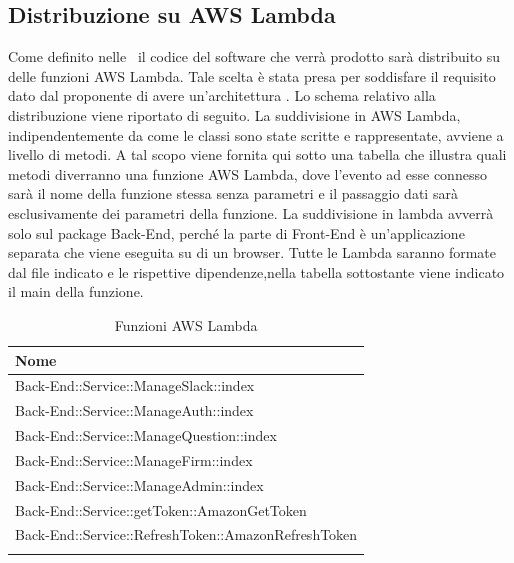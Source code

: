 \documentclass[../DefinizioneDiProdotto_v3.0.0.tex]{subfiles}
\begin{document}
\subsection{Distribuzione su AWS Lambda}
Come definito nelle \normediprogettov\ il codice del software che verrà prodotto sarà distribuito su delle funzioni AWS Lambda. Tale scelta è stata presa per soddisfare il requisito dato dal proponente di avere un'architettura . Lo schema relativo alla distribuzione viene riportato di seguito.
La suddivisione in AWS Lambda, indipendentemente da come le classi sono state scritte
e rappresentate, avviene a livello di metodi. A tal scopo viene fornita qui sotto una tabella che illustra quali metodi diverranno una
funzione AWS Lambda, dove l'evento ad esse connesso sarà il nome della funzione stessa
senza parametri e il passaggio dati sarà esclusivamente dei parametri della funzione. La
suddivisione in lambda avverrà solo sul package Back-End, perché la parte di Front-End è
un'applicazione separata che viene eseguita su di un browser.
Tutte le Lambda saranno formate dal file indicato e le rispettive dipendenze,nella tabella sottostante viene indicato il main della funzione.
\begin{longtable}[c] { >{\centering\arraybackslash}p{10cm} }
	\toprule
	\centerline{\textbf{Nome}}                          \\
	\midrule
	Back-End::Service::ManageSlack::index               \\
	\addlinespace[0.3em]
	Back-End::Service::ManageAuth::index                \\
	\addlinespace[0.3em]
	Back-End::Service::ManageQuestion::index            \\
	\addlinespace[0.3em]
	Back-End::Service::ManageFirm::index                \\
	\addlinespace[0.3em]
	Back-End::Service::ManageAdmin::index               \\
	\addlinespace[0.3em]
	Back-End::Service::getToken::AmazonGetToken         \\
	\addlinespace[0.3em]
	Back-End::Service::RefreshToken::AmazonRefreshToken \\
	\bottomrule
	\caption{Funzioni AWS Lambda}
\end{longtable}
\end{document}
